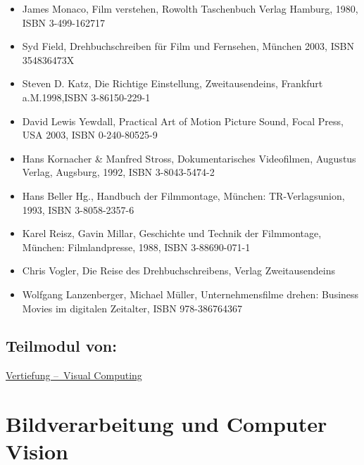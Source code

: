 \begin{itemize}
\tightlist
\item
  James Monaco, Film verstehen, Rowolth Taschenbuch Verlag Hamburg,
  1980, ISBN 3-499-162717
\item
  Syd Field, Drehbuchschreiben für Film und Fernsehen, München 2003,
  ISBN 354836473X
\item
  Steven D. Katz, Die Richtige Einstellung, Zweitausendeins, Frankfurt
  a.M.1998,ISBN 3-86150-229-1
\item
  David Lewis Yewdall, Practical Art of Motion Picture Sound, Focal
  Press, USA 2003, ISBN 0-240-80525-9
\item
  Hans Kornacher \& Manfred Stross, Dokumentarisches Videofilmen,
  Augustus Verlag, Augsburg, 1992, ISBN 3-8043-5474-2
\item
  Hans Beller Hg., Handbuch der Filmmontage, München: TR-Verlagsunion,
  1993, ISBN 3-8058-2357-6
\item
  Karel Reisz, Gavin Millar, Geschichte und Technik der Filmmontage,
  München: Filmlandpresse, 1988, ISBN 3-88690-071-1
\item
  Chris Vogler, Die Reise des Drehbuchschreibens, Verlag Zweitausendeins
\item
  Wolfgang Lanzenberger, Michael Müller, Unternehmensfilme drehen:
  Business Movies im digitalen Zeitalter, ISBN 978-386764367
\end{itemize}

\hypertarget{teilmodul-vonpathlabelmi-2017modulbeschreibungen-bachelorba_vc-audiovisuelles-medienprojekt-2}{%
\section*{Teilmodul
von:\label{/mi-2017/modulbeschreibungen-bachelor/BA_VC-audiovisuelles-medienprojekt-2}}\label{teilmodul-vonpathlabelmi-2017modulbeschreibungen-bachelorba_vc-audiovisuelles-medienprojekt-2}}

\hyperref[/mi-2017/modulbeschreibungen-bachelor/BA_Vertiefung-Visual-Computing]{Vertiefung – Visual Computing}

\hypertarget{bildverarbeitung-und-computer-visionpathlabelmi-2017modulbeschreibungen-bachelorba_vc-bildverarbeitung-und-computer-vision}{%
\chapter{Bildverarbeitung und Computer
Vision\label{/mi-2017/modulbeschreibungen-bachelor/BA_VC-bildverarbeitung-und-computer-vision}}\label{bildverarbeitung-und-computer-visionpathlabelmi-2017modulbeschreibungen-bachelorba_vc-bildverarbeitung-und-computer-vision}}

